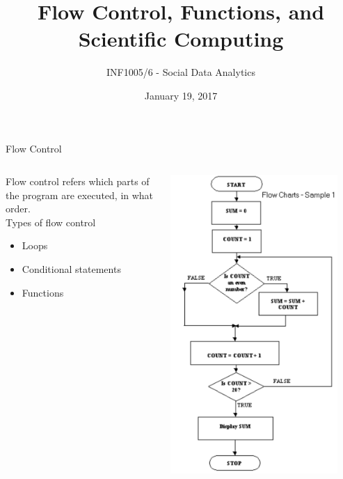 \documentclass{beamer}
\title[Flow Control, Functions]
{Flow Control, Functions, and Scientific Computing}
\author{INF1005/6 - Social Data Analytics}
\institute[] {
    Professor Alex Hanna
}
\date[] {
January 19, 2017
}
\begin{document}
\begin{frame}
  \titlepage
\end{frame}

\begin{frame}{Flow Control}
    \begin{columns}
        \begin{column}{0.5\textwidth}
            Flow control refers which parts of the program are executed, in what order. \\
            \vspace*{1em}
            Types of flow control
            \begin{itemize}[<2->]
                \item Loops
                \item Conditional statements
                \item Functions
            \end{itemize}
        \end{column}
        \begin{column}{0.4\textwidth}
            \includegraphics[width=0.9\textwidth]{img/flow-chart.pdf}
        \end{column}
    \end{columns}
\end{frame}
\end{document}
